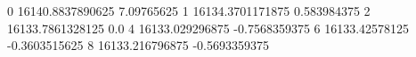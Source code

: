 0 16140.8837890625 7.09765625
1 16134.3701171875 0.583984375
2 16133.7861328125 0.0
4 16133.029296875 -0.7568359375
6 16133.42578125 -0.3603515625
8 16133.216796875 -0.5693359375

